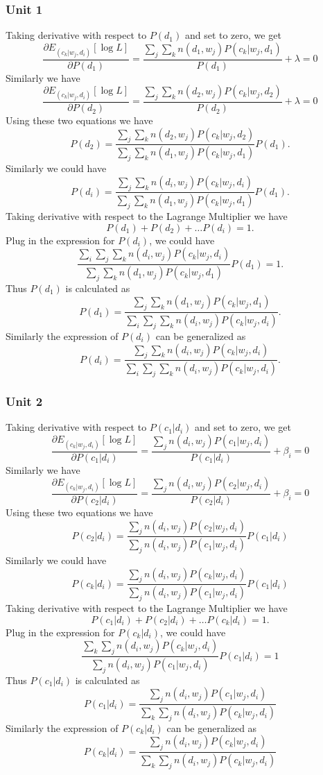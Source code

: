 \subsubsection{Unit 1}
Taking derivative with respect to $P(d_1)$ and set to zero, we get
\[\dfrac{\partial E_{(c_k|w_j,d_i)}[\log{L}]}{\partial P(d_1)}=\dfrac{\sum\limits_{j}\sum\limits_{k}n(d_1,w_j)P(c_k|w_j,d_1)}{P(d_1)} +\lambda=0\]
Similarly we have 
\[\dfrac{\partial E_{(c_k|w_j,d_i)}[\log{L}]}{\partial P(d_2)}=\dfrac{\sum\limits_{j}\sum\limits_{k}n(d_2,w_j)P(c_k|w_j,d_2)}{P(d_2)} +\lambda=0 \]
Using these two equations we have
\[P(d_2)=\dfrac{\sum\limits_{j}\sum\limits_{k}n(d_2,w_j)P(c_k|w_j,d_2)}{\sum\limits_{j}\sum\limits_{k}n(d_1,w_j)P(c_k|w_j,d_1)}P(d_1).\]
Similarly we could have
\[P(d_i)=\dfrac{\sum\limits_{j}\sum\limits_{k}n(d_i,w_j)P(c_k|w_j,d_i)}{\sum\limits_{j}\sum\limits_{k}n(d_1,w_j)P(c_k|w_j,d_1)}P(d_1).\]
Taking derivative with respect to the Lagrange Multiplier we have
\[P(d_1)+P(d_2)+\ldots P(d_i)=1.\]
Plug in the expression for $P(d_i)$, we could have
\[\dfrac{\sum\limits_{i}\sum\limits_{j}\sum\limits_{k}n(d_i,w_j)P(c_k|w_j,d_i)}{\sum\limits_{j}\sum\limits_{k}n(d_1,w_j)P(c_k|w_j,d_1)}P(d_1)=1.\]
Thus $P(d_1)$ is calculated as 
\[P(d_1)=\dfrac{\sum\limits_{j}\sum\limits_{k}n(d_1,w_j)P(c_k|w_j,d_1)}{\sum\limits_{i}\sum\limits_{j}\sum\limits_{k}n(d_i,w_j)P(c_k|w_j,d_i)}.\]
Similarly the expression of $P(d_i)$ can be generalized as 
\[P(d_i)=\dfrac{\sum\limits_{j}\sum\limits_{k}n(d_i,w_j)P(c_k|w_j,d_i)}{\sum\limits_{i}\sum\limits_{j}\sum\limits_{k}n(d_i,w_j)P(c_k|w_j,d_i)}.\]

\subsubsection{Unit 2}
Taking derivative with respect to $P(c_1|d_i)$ and set to zero, we get
\[\dfrac{\partial E_{(c_k|w_j,d_i)}[\log{L}]}{\partial P(c_1|d_i)}=\dfrac{\sum\limits_{j}n(d_i,w_j)P(c_1|w_j,d_i)}{P(c_1|d_i)} +\beta_i=0\]
Similarly we have 
\[\dfrac{\partial E_{(c_k|w_j,d_i)}[\log{L}]}{\partial P(c_2|d_i)}=\dfrac{\sum\limits_{j}n(d_i,w_j)P(c_2|w_j,d_i)}{P(c_2|d_i)} +\beta_i=0\]
Using these two equations we have 
\[P(c_2|d_i)=\dfrac{\sum\limits_{j}n(d_i,w_j)P(c_2|w_j,d_i)}{\sum\limits_{j}n(d_i,w_j)P(c_1|w_j,d_i)}P(c_1|d_i)\]
Similarly we could have
\[P(c_k|d_i)=\dfrac{\sum\limits_{j}n(d_i,w_j)P(c_k|w_j,d_i)}{\sum\limits_{j}n(d_i,w_j)P(c_1|w_j,d_i)}P(c_1|d_i)\]
Taking derivative with respect to the Lagrange Multiplier we have
\[P(c_1|d_i)+P(c_2|d_i)+\ldots P(c_k|d_i)=1.\]
Plug in the expression for $P(c_k|d_i)$, we could have
\[\dfrac{\sum\limits_{k}\sum\limits_{j}n(d_i,w_j)P(c_k|w_j,d_i)}{\sum\limits_{j}n(d_i,w_j)P(c_1|w_j,d_i)}P(c_1|d_i)=1\]
Thus $P(c_1|d_i)$ is calculated as 
\[P(c_1|d_i)=\dfrac{\sum\limits_{j}n(d_i,w_j)P(c_1|w_j,d_i)}{\sum\limits_{k}\sum\limits_{j}n(d_i,w_j)P(c_k|w_j,d_i)}\]
Similarly the expression of $P(c_k|d_i)$ can be generalized as 
\[P(c_k|d_i)=\dfrac{\sum\limits_{j}n(d_i,w_j)P(c_k|w_j,d_i)}{\sum\limits_{k}\sum\limits_{j}n(d_i,w_j)P(c_k|w_j,d_i)}\]

